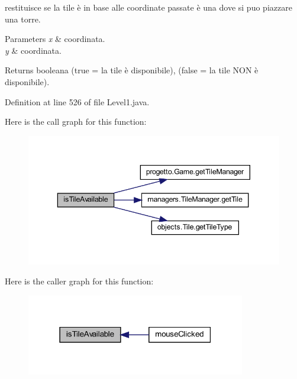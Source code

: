 restituisce se la tile è in base alle coordinate passate è una dove si puo piazzare una torre. 


\begin{DoxyParams}{Parameters}
{\em x} & coordinata. \\
\hline
{\em y} & coordinata.\\
\hline
\end{DoxyParams}
\begin{DoxyReturn}{Returns}
booleana (true = la tile è disponibile), (false = la tile N\+ON è disponibile). 
\end{DoxyReturn}


Definition at line 526 of file Level1.\+java.

Here is the call graph for this function\+:\nopagebreak
\begin{figure}[H]
\begin{center}
\leavevmode
\includegraphics[width=343pt]{classscenes_1_1_level1_aaeac2ee6b3a920a21928ee7b3dc8e7a9_cgraph}
\end{center}
\end{figure}
Here is the caller graph for this function\+:\nopagebreak
\begin{figure}[H]
\begin{center}
\leavevmode
\includegraphics[width=271pt]{classscenes_1_1_level1_aaeac2ee6b3a920a21928ee7b3dc8e7a9_icgraph}
\end{center}
\end{figure}
\mbox{\label{classscenes_1_1_level1_ab68417e6738c05037923f5f0f21eb586}} 
